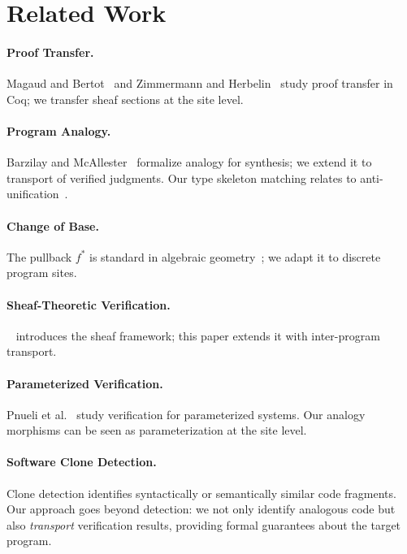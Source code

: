 \documentclass[11pt]{article}
\begin{document}
\section{Related Work}\label{sec:related}

\paragraph{Proof Transfer.}
Magaud and Bertot~\cite{Magaud2000} and Zimmermann and
Herbelin~\cite{Zimmermann2015} study proof transfer in Coq; we
transfer sheaf sections at the site level.

\paragraph{Program Analogy.}
Barzilay and McAllester~\cite{Barzilay2003} formalize analogy for
synthesis; we extend it to transport of verified judgments.  Our
type skeleton matching relates to anti-unification~\cite{Plotkin1970}.

\paragraph{Change of Base.}
The pullback $f^{*}$ is standard in algebraic
geometry~\cite{Hartshorne1977,Vakil2017}; we adapt it to discrete
program sites.

\paragraph{Sheaf-Theoretic Verification.}
\JuGeo~\cite{JuGeo2023} introduces the sheaf framework; this paper
extends it with inter-program transport.

\paragraph{Parameterized Verification.}
Pnueli et al.~\cite{Pnueli2001} study verification for parameterized
systems.  Our analogy morphisms can be seen as parameterization at
the site level.

\paragraph{Software Clone Detection.}
Clone detection identifies syntactically or semantically
similar code fragments.  Our approach goes beyond detection: we not
only identify analogous code but also \emph{transport} verification
results, providing formal guarantees about the target program.
\end{document}
